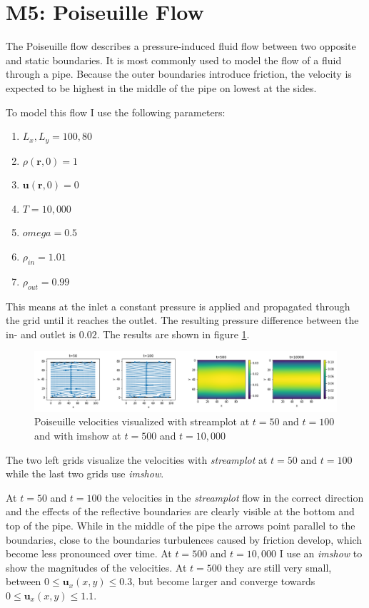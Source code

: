 \documentclass[a4paper,11pt, oneside]{book}
\begin{document}
\section{M5: Poiseuille Flow}
The Poiseuille flow describes a pressure-induced fluid flow between two opposite and static boundaries. 
It is most commonly used to model the flow of a fluid through a pipe. 
Because the outer boundaries introduce friction, the velocity is expected to be highest in the middle of the pipe on lowest at the sides.

To model this flow I use the following parameters:
\begin{enumerate}
    \item $L_{x}, L_{y} = 100, 80$
    \item $\rho(\textbf{r}, 0) = 1$
    \item $\textbf{u}(\textbf{r}, 0) = 0$
    \item $T = 10,000$
    \item $omega = 0.5$
    \item $\rho_{in} = 1.01$
    \item $\rho_{out} = 0.99$
\end{enumerate}
This means at the inlet a constant pressure is applied and propagated through the grid until it reaches the outlet. The resulting pressure difference between the in- and outlet is $0.02$. 
The results are shown in figure \ref{fig:m5-1-vel-time}.
\begin{figure}[ht]
\centering
\includegraphics[width=\columnwidth]{milestones/final/img/m5-1-vel-time.png}
\vspace*{-4mm}
\caption[Poiseuille Velocities]{Poiseuille velocities visualized with streamplot at $t=50$ and $t=100$ and with imshow at $t=500$ and $t=10,000$ }
\label{fig:m5-1-vel-time}
\end{figure}
The two left grids visualize the velocities with \textit{streamplot} at $t=50$ and $t=100$ while the last two grids use \textit{imshow}. 

At $t=50$ and $t=100$ the velocities in the \textit{streamplot} flow in the correct direction and the effects of the reflective boundaries are clearly visible at the bottom and top of the pipe. While in the middle of the pipe the arrows point parallel to the boundaries, close to the boundaries turbulences caused by friction develop, which become less pronounced over time.
At $t=500$ and $t=10,000$ I use an \textit{imshow} to show the magnitudes of the velocities.
At $t=500$ they are still very small, between $0\leq\textbf{u}_{x}(x,y)\leq0.3$, but become larger and converge towards $0\leq\textbf{u}_{x}(x,y)\leq1.1$.
\end{document}
